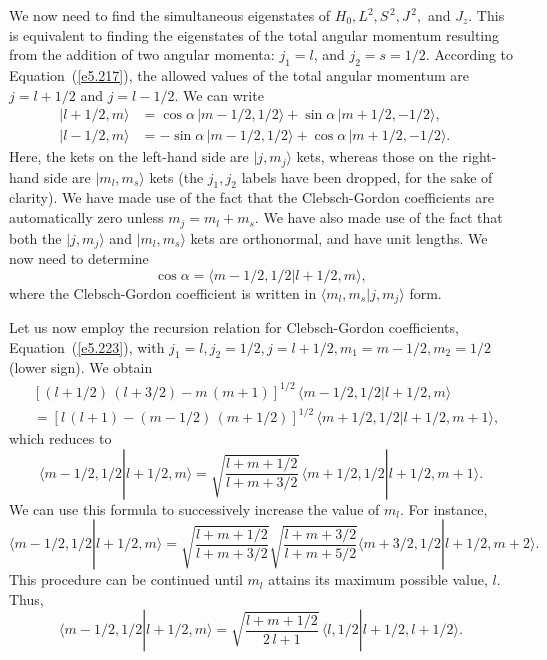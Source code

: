 We now need to find the simultaneous eigenstates of $H_0, L^2, S^{\,2}, J^{\,2},$ and $J_z$.
This is equivalent to finding the eigenstates of the total angular momentum
resulting from the  addition of  two angular momenta: $j_1=l$, and $j_2 = s = 1/2$. 
According to Equation~(\ref{e5.217}), the allowed values of the total angular
momentum are $j=l+1/2$ and $j=l-1/2$. We can write
\begin{align}
|l+1/2, m\rangle &= \cos\alpha\, |m-1/2, 1/2\rangle + \sin\alpha\,
|m+1/2, -1/2\rangle,~~\\[0.5ex]
|l-1/2, m\rangle &= -\sin\alpha\, |m-1/2, 1/2\rangle + \cos\alpha\,
|m+1/2, -1/2\rangle.~~~~
\end{align}
Here, the kets on the left-hand side are $|j,m_j\rangle $ kets, whereas
those on the right-hand side are $|m_l, m_s\rangle$ kets
(the $j_1, j_2$ labels have been dropped, for the sake of clarity). We have made use
of the fact that the Clebsch-Gordon coefficients are automatically
zero unless $m_j=m_l+m_s$. We have also made use of the fact that
both the $|j,m_j\rangle $  and  $|m_l, m_s\rangle$ kets are orthonormal,
and have unit lengths. We now need to determine 
\begin{equation}
\cos\alpha = \langle m-1/2,1/2|l+1/2, m\rangle,
\end{equation}
where the Clebsch-Gordon coefficient is written in $\langle m_l, m_s| j, m_j\rangle$
form. 

Let us now employ the recursion relation for Clebsch-Gordon coefficients, Equation~(\ref{e5.223}),
with $j_1=l, j_2 = 1/2, j = l+1/2, m_1=m-1/2, m_2=1/2$ (lower sign). 
We obtain 
\begin{align}
&[(l+1/2)\,(l+3/2)-m\,(m+1)]^{1/2} \,\langle m-1/2, 1/2|l+1/2, m\rangle\nonumber\\[0.5ex]
&= [l\,(l+1)-(m-1/2)\,(m+1/2)]^{1/2}\, \langle m+1/2, 1/2|l+1/2, m+1\rangle,
\end{align}
which reduces to
\begin{equation}
\langle m-1/2, 1/2|l+1/2, m\rangle = \sqrt{\frac{l+m+1/2}{l+m+3/2}}\,
 \langle m+1/2, 1/2|l+1/2, m+1\rangle.
\end{equation}
We can use this formula to successively increase the value of $m_l$. For
instance,
\begin{equation}
\langle m-1/2, 1/2|l+1/2, m\rangle =\sqrt{\frac{l+m+1/2}{l+m+3/2}}
\sqrt{\frac{l+m+3/2}{l+m+5/2}}  \langle m+3/2, 1/2|l+1/2, m+2\rangle.
\end{equation}
This procedure can be continued until $m_l$ attains its maximum possible value,
$l$. Thus,
\begin{equation}\label{e6.110}
\langle m-1/2, 1/2|l+1/2, m\rangle = \sqrt{\frac{l+m+1/2}{2\,l+1}}\,
 \langle l, 1/2|l+1/2, l+1/2\rangle.
\end{equation}

